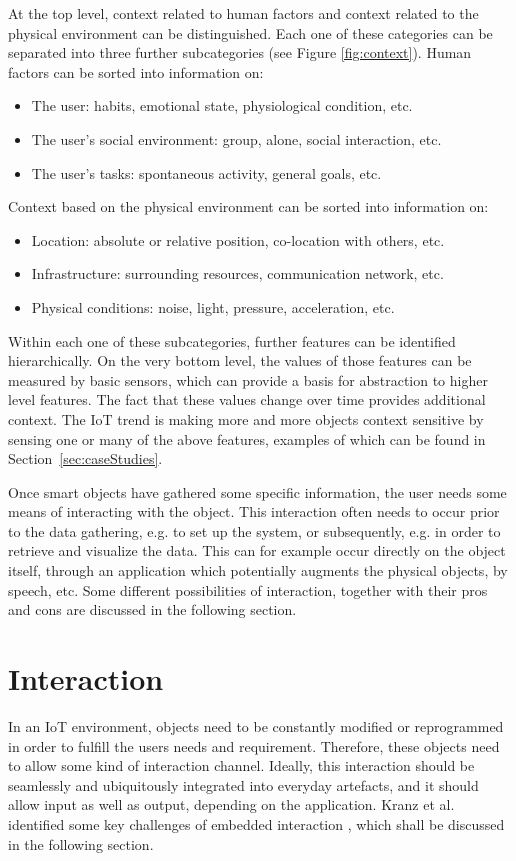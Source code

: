 At the top level, context related to human factors and context related to the physical environment can be distinguished. Each one of these categories can be separated into three further subcategories (see Figure \ref{fig:context}). Human factors can be sorted into information on:

\begin{itemize}
	\item The user: habits, emotional state, physiological condition, etc.
	\item The user's social environment: group, alone, social interaction, etc.
	\item The user's tasks: spontaneous activity, general goals, etc.
\end{itemize}

Context based on the physical environment can be sorted into information on:
\begin{itemize}
	\item Location: absolute or relative position, co-location with others, etc.
	\item Infrastructure: surrounding resources, communication network, etc.
	\item Physical conditions: noise, light, pressure, acceleration, etc.
\end{itemize}

Within each one of these subcategories, further features can be identified hierarchically. 
On the very bottom level, the values of those features can be measured by basic sensors, which can provide a basis for abstraction to higher level features. 
The fact that these values change over time provides additional context. 
The IoT trend is making more and more objects context sensitive by sensing one or many of the above features, examples of which can be found in Section~\ref{sec:caseStudies}.

Once smart objects have gathered some specific information, the user needs some means of interacting with the object.
This interaction often needs to occur prior to the data gathering, e.g. to set up the system, or subsequently, e.g. in order to retrieve and visualize the data. This can for example occur directly on the object itself, through an application which potentially augments the physical objects, by speech, etc.
Some different possibilities of interaction, together with their pros and cons are discussed in the following section.

\section{Interaction}
\label{sec:interaction}
In an IoT environment, objects need to be constantly modified or reprogrammed in order to fulfill the  users needs and requirement. 
Therefore, these objects need to allow some kind of interaction channel. 
Ideally, this interaction should be seamlessly and ubiquitously integrated into everyday artefacts, and it should allow input as well as output, depending on the application. 
Kranz et al. identified some key challenges of embedded interaction \cite{kranz10}, which shall be discussed in the following section.

